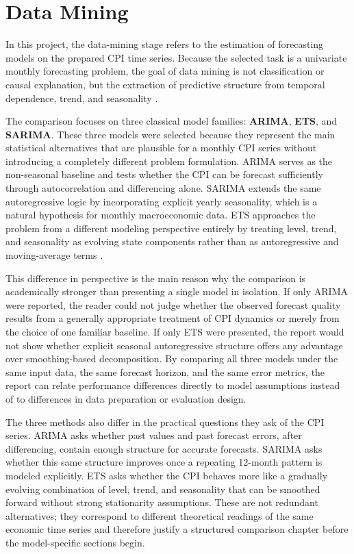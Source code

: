 %
%
%

\chapter{Data Mining}
\label{ch:data-mining-overview}

In this project, the data-mining stage refers to the estimation of forecasting models on the prepared CPI time series. Because the selected task is a univariate monthly forecasting problem, the goal of data mining is not classification or causal explanation, but the extraction of predictive structure from temporal dependence, trend, and seasonality \cite{Fayyad:1996,Hyndman2021}.

The comparison focuses on three classical model families: \textbf{ARIMA}, \textbf{ETS}, and \textbf{SARIMA}. These three models were selected because they represent the main statistical alternatives that are plausible for a monthly CPI series without introducing a completely different problem formulation. ARIMA serves as the non-seasonal baseline and tests whether the CPI can be forecast sufficiently through autocorrelation and differencing alone. SARIMA extends the same autoregressive logic by incorporating explicit yearly seasonality, which is a natural hypothesis for monthly macroeconomic data. ETS approaches the problem from a different modeling perspective entirely by treating level, trend, and seasonality as evolving state components rather than as autoregressive and moving-average terms \cite{Box2015,Hyndman2021}.

This difference in perspective is the main reason why the comparison is academically stronger than presenting a single model in isolation. If only ARIMA were reported, the reader could not judge whether the observed forecast quality results from a generally appropriate treatment of CPI dynamics or merely from the choice of one familiar baseline. If only ETS were presented, the report would not show whether explicit seasonal autoregressive structure offers any advantage over smoothing-based decomposition. By comparing all three models under the same input data, the same forecast horizon, and the same error metrics, the report can relate performance differences directly to model assumptions instead of to differences in data preparation or evaluation design.

The three methods also differ in the practical questions they ask of the CPI series. ARIMA asks whether past values and past forecast errors, after differencing, contain enough structure for accurate forecasts. SARIMA asks whether this same structure improves once a repeating 12-month pattern is modeled explicitly. ETS asks whether the CPI behaves more like a gradually evolving combination of level, trend, and seasonality that can be smoothed forward without strong stationarity assumptions. These are not redundant alternatives; they correspond to different theoretical readings of the same economic time series and therefore justify a structured comparison chapter before the model-specific sections begin.

